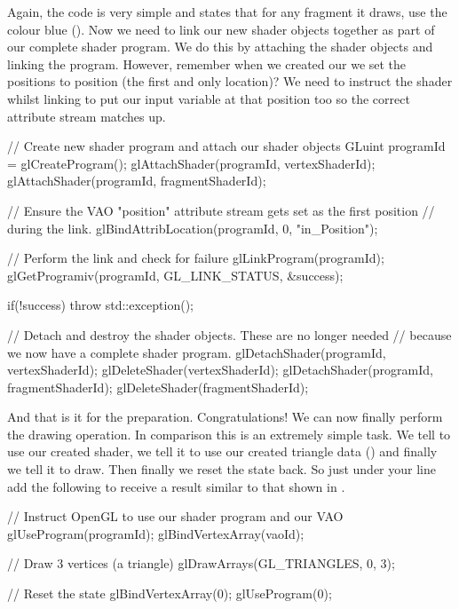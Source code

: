 \documentclass[10pt]{article}
\begin{document}
Again, the  code is very simple and states that for any
fragment it draws, use the colour blue (). Now we
need to link our new shader objects together as part of our complete
shader program.  We do this by attaching the shader objects and linking
the program. However, remember when we created our  we set
the positions  to position  (the first and only
location)? We need to instruct the shader whilst linking to put our
input variable  at that position too so the correct
attribute stream matches up.

\begin{Code}
  // Create new shader program and attach our shader objects
  GLuint programId = glCreateProgram();
  glAttachShader(programId, vertexShaderId);
  glAttachShader(programId, fragmentShaderId);

  // Ensure the VAO "position" attribute stream gets set as the first position
  // during the link.
  glBindAttribLocation(programId, 0, "in_Position");

  // Perform the link and check for failure
  glLinkProgram(programId);
  glGetProgramiv(programId, GL_LINK_STATUS, &success);

  if(!success)
  {
    throw std::exception();
  }

  // Detach and destroy the shader objects. These are no longer needed
  // because we now have a complete shader program.
  glDetachShader(programId, vertexShaderId);
  glDeleteShader(vertexShaderId);
  glDetachShader(programId, fragmentShaderId);
  glDeleteShader(fragmentShaderId);
\end{Code}

And that is it for the preparation. Congratulations! We can now finally
perform the drawing operation.  In comparison this is an extremely
simple task. We tell  to use our created shader, we tell
it to use our created triangle data () and finally we tell
it to draw. Then finally we reset the state back. So just under your
 line add the following to receive a result similar to
that shown in .

\begin{Code}
  // Instruct OpenGL to use our shader program and our VAO
  glUseProgram(programId);
  glBindVertexArray(vaoId);

  // Draw 3 vertices (a triangle)
  glDrawArrays(GL_TRIANGLES, 0, 3);

  // Reset the state
  glBindVertexArray(0);
  glUseProgram(0);
\end{Code}
\end{document}
